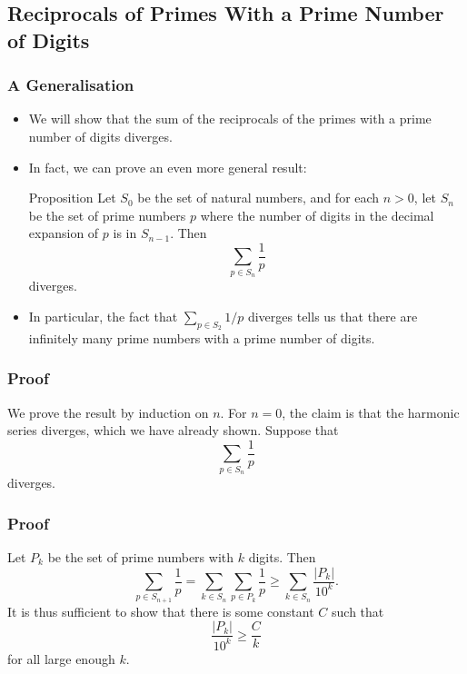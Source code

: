 \documentclass{beamer}
\begin{document}
\subsection{Reciprocals of Primes With a Prime Number of Digits}

\begin{frame}
    \frametitle{A Generalisation}

    \begin{itemize}
        \item We will show that the sum of the reciprocals of the primes with a prime number of digits diverges. \pause
        \item In fact, we can prove an even more general result:
        \begin{block}{Proposition}
            Let $S_0$ be the set of natural numbers, and for each $n > 0$, let $S_n$ be the set of prime numbers $p$ where the number of digits in the decimal expansion of $p$ is in $S_{n - 1}$. Then
            \[
                \sum_{p \in S_n} \frac{1}{p}
            \]
            diverges.
        \end{block}
        \pause
        \item In particular, the fact that $\sum_{p \in S_2} 1\slash p$ diverges tells us that there are infinitely many prime numbers with a prime number of digits.
    \end{itemize}

\end{frame}

\begin{frame}
    \frametitle{Proof}

    We prove the result by induction on $n$. \pause
    For $n = 0$, the claim is that the harmonic series diverges, which we have already shown. \pause
    Suppose that
    \[
       \sum_{p \in S_n} \frac{1}{p}
    \]
    diverges.

\end{frame}

\begin{frame}
    \frametitle{Proof}

    Let $P_k$ be the set of prime numbers with $k$ digits. Then
    \[
       \sum_{p \in S_{n + 1}} \frac{1}{p} = \sum_{k \in S_n} \sum_{p \in P_k} \frac{1}{p} \geq \sum_{k \in S_n} \frac{\left| P_k \right|}{10^{k}}.
    \]
    \pause
    It is thus sufficient to show that there is some constant $C$ such that
    \[
       \frac{\left| P_k \right|}{10^{k}} \geq \frac{C}{k}
    \]
    for all large enough $k$.

\end{frame}
\end{document}
